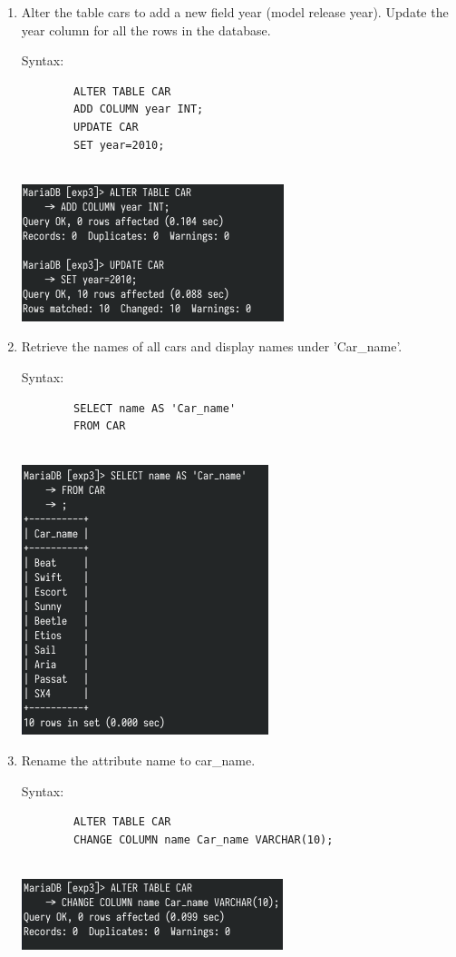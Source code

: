 \documentclass[13pt,oneside]{book}
\begin{document}
\begin{enumerate}
		
		\item
		Alter the table cars to add a new field year (model release year). Update
		 the year column for all the rows in the database.
		 
		Syntax:
		\begin{verbatim}
		ALTER TABLE CAR
		ADD COLUMN year INT;
		UPDATE CAR
		SET year=2010;
		
		\end{verbatim}
		\includegraphics[]{img/p3/ss8.png}
		
		
		\item
		Retrieve the names of all cars and display names under 'Car\_name'.
		 
		Syntax:
		\begin{verbatim}
		SELECT name AS 'Car_name'
		FROM CAR
		
		\end{verbatim}
		\includegraphics[]{img/p3/ss9.png}
		
		
		\item
		Rename the attribute name to car\_name.
		 
		Syntax:
		\begin{verbatim}
		ALTER TABLE CAR
		CHANGE COLUMN name Car_name VARCHAR(10);
		
		\end{verbatim}
		\includegraphics[]{img/p3/ss10.png}
		

\end{enumerate}
\end{document}
